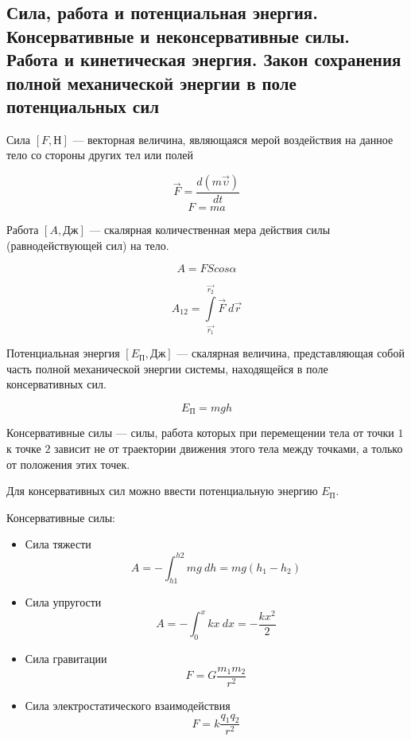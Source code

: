 \subsection{Сила, работа и потенциальная энергия. Консервативные и неконсервативные силы. Работа и кинетическая энергия. Закон сохранения полной механической энергии в поле потенциальных сил}

\begin{definition}
    Сила $[F, Н]$ — векторная величина, являющаяся мерой воздействия на данное тело со стороны других тел или полей
\end{definition}

$$\vec F=\frac{d(m\vec\upsilon)}{dt}$$ 
$$F=ma$$

\begin{definition}
    Работа $[A, Дж]$ — скалярная количественная мера действия силы (равнодействующей сил) на тело.
\end{definition}

$$A=FScos\alpha$$

$$A_{12}=\int\limits_{\vec{r_1}}^{\vec{r_2}}\vec F\ d\vec r$$

\begin{definition}
    Потенциальная энергия $[E_П, Дж]$ — скалярная величина, представляющая собой часть полной механической энергии системы, находящейся в поле консервативных сил.
\end{definition}

$$E_П=mgh$$

\begin{definition}
    Консервативные силы — силы, работа которых при перемещении тела от точки $1$ к точке $2$ 
    зависит не от траектории движения этого тела между точками, а только от положения этих точек.
\end{definition}

Для консервативных сил можно ввести потенциальную энергию $E_П$.

Консервативные силы:

\begin{itemize}
    \item Сила тяжести
    $$A=-\int_{h1}^{h2}mg\ dh=mg(h_1-h_2)$$
    \item Сила упругости
    $$A=-\int_0^xkx\ dx=-\frac{kx^2}{2}$$
    \item Сила гравитации
    $$F=G\frac{m_1m_2}{r^2}$$
    \item Сила электростатического взаимодействия
    $$F=k\frac{q_1q_2}{r^2}$$
\end{itemize}

